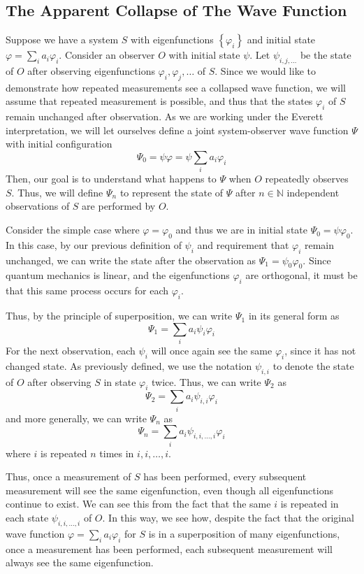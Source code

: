 \documentclass[
    12pt,
    letterpaper,
    aps,
    prd,
    longbibliography,
    twocolumn,
    nofootinbib,
    raggedbottom,
    amsmath,
    amssymb,
    amsfonts,
]{revtex4-1}
\newcommand{\set}[1]{\left\{#1\right\}}
\newcommand{\mbb}[1]{\mathbb{#1}}
\renewcommand{\phi}{\varphi}
\begin{document}
\subsection{The Apparent Collapse of The Wave Function}
\label{sec:mwi}

Suppose we have a system $S$ with eigenfunctions $\set{\phi_i}$ and initial state $\phi = \sum_i a_i \phi_i$. Consider an observer $O$ with initial state $\psi$. Let $\psi_{i,j,\ldots}$ be the state of $O$ after observing eigenfunctions $\phi_i, \phi_j, \ldots$ of $S$. Since we would like to demonstrate how repeated measurements see a collapsed wave function, we will assume that repeated measurement is possible, and thus that the states $\phi_i$ of $S$ remain unchanged after observation. As we are working under the Everett interpretation, we will let ourselves define a joint system-observer wave function $\Psi$ with initial configuration
\[
    \Psi_0 = \psi \phi = \psi \sum_i a_i \phi_i
\]
Then, our goal is to understand what happens to $\Psi$ when $O$ repeatedly observes $S$. Thus, we will define $\Psi_n$ to represent the state of $\Psi$ after $n \in \mbb N$ independent observations of $S$ are performed by $O$.

Consider the simple case where $\phi = \phi_0$ and thus we are in initial state $\Psi_0 = \psi \phi_0$. In this case, by our previous definition of $\psi_i$ and requirement that $\phi_i$ remain unchanged, we can write the state after the observation as $\Psi_1 = \psi_0 \phi_0$. Since quantum mechanics is linear, and the eigenfunctions $\phi_i$ are orthogonal, it must be that this same process occurs for each $\phi_i$.

Thus, by the principle of superposition, we can write $\Psi_1$ in its general form as
\[
    \Psi_1 = \sum_i a_i \psi_i \phi_i
\]
For the next observation, each $\psi_i$ will once again see the same $\phi_i$, since it has not changed state. As previously defined, we use the notation $\psi_{i, i}$ to denote the state of $O$ after observing $S$ in state $\phi_i$ twice. Thus, we can write $\Psi_2$ as
\[
    \Psi_2 = \sum_i a_i \psi_{i,i} \phi_i
\]
and more generally, we can write $\Psi_n$ as
\[
    \Psi_n = \sum_i a_i \psi_{i,i,\ldots,i} \phi_i
\]
where $i$ is repeated $n$ times in $i,i,\ldots,i$.

Thus, once a measurement of $S$ has been performed, every subsequent measurement will see the same eigenfunction, even though all eigenfunctions continue to exist. We can see this from the fact that the same $i$ is repeated in each state $\psi_{i,i,\ldots,i}$ of $O$. In this way, we see how, despite the fact that the original wave function $\phi = \sum_i a_i \phi_i$ for $S$ is in a superposition of many eigenfunctions, once a measurement has been performed, each subsequent measurement will always see the same eigenfunction.
\end{document}
